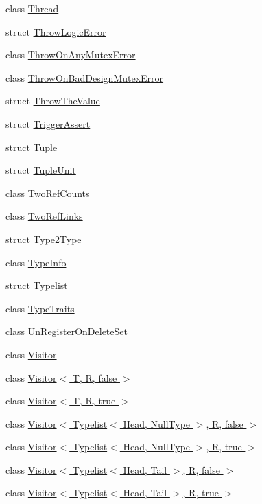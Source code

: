\begin{DoxyCompactItemize}
class \hyperlink{classLoki_1_1Thread}{Thread}
\item 
struct \hyperlink{structLoki_1_1ThrowLogicError}{Throw\+Logic\+Error}
\item 
class \hyperlink{classLoki_1_1ThrowOnAnyMutexError}{Throw\+On\+Any\+Mutex\+Error}
\item 
class \hyperlink{classLoki_1_1ThrowOnBadDesignMutexError}{Throw\+On\+Bad\+Design\+Mutex\+Error}
\item 
struct \hyperlink{structLoki_1_1ThrowTheValue}{Throw\+The\+Value}
\item 
struct \hyperlink{structLoki_1_1TriggerAssert}{Trigger\+Assert}
\item 
struct \hyperlink{structLoki_1_1Tuple}{Tuple}
\item 
struct \hyperlink{structLoki_1_1TupleUnit}{Tuple\+Unit}
\item 
class \hyperlink{classLoki_1_1TwoRefCounts}{Two\+Ref\+Counts}
\item 
class \hyperlink{classLoki_1_1TwoRefLinks}{Two\+Ref\+Links}
\item 
struct \hyperlink{structLoki_1_1Type2Type}{Type2\+Type}
\item 
class \hyperlink{classLoki_1_1TypeInfo}{Type\+Info}
\item 
struct \hyperlink{structLoki_1_1Typelist}{Typelist}
\item 
class \hyperlink{classLoki_1_1TypeTraits}{Type\+Traits}
\item 
class \hyperlink{structLoki_1_1UnRegisterOnDeleteSet}{Un\+Register\+On\+Delete\+Set}
\item 
class \hyperlink{classLoki_1_1Visitor}{Visitor}
\item 
class \hyperlink{classLoki_1_1Visitor_3_01T_00_01R_00_01false_01_4}{Visitor$<$ T, R, false $>$}
\item 
class \hyperlink{classLoki_1_1Visitor_3_01T_00_01R_00_01true_01_4}{Visitor$<$ T, R, true $>$}
\item 
class \hyperlink{classLoki_1_1Visitor_3_01Typelist_3_01Head_00_01NullType_01_4_00_01R_00_01false_01_4}{Visitor$<$ Typelist$<$ Head, Null\+Type $>$, R, false $>$}
\item 
class \hyperlink{classLoki_1_1Visitor_3_01Typelist_3_01Head_00_01NullType_01_4_00_01R_00_01true_01_4}{Visitor$<$ Typelist$<$ Head, Null\+Type $>$, R, true $>$}
\item 
class \hyperlink{classLoki_1_1Visitor_3_01Typelist_3_01Head_00_01Tail_01_4_00_01R_00_01false_01_4}{Visitor$<$ Typelist$<$ Head, Tail $>$, R, false $>$}
\item 
class \hyperlink{classLoki_1_1Visitor_3_01Typelist_3_01Head_00_01Tail_01_4_00_01R_00_01true_01_4}{Visitor$<$ Typelist$<$ Head, Tail $>$, R, true $>$}
\end{DoxyCompactItemize}
